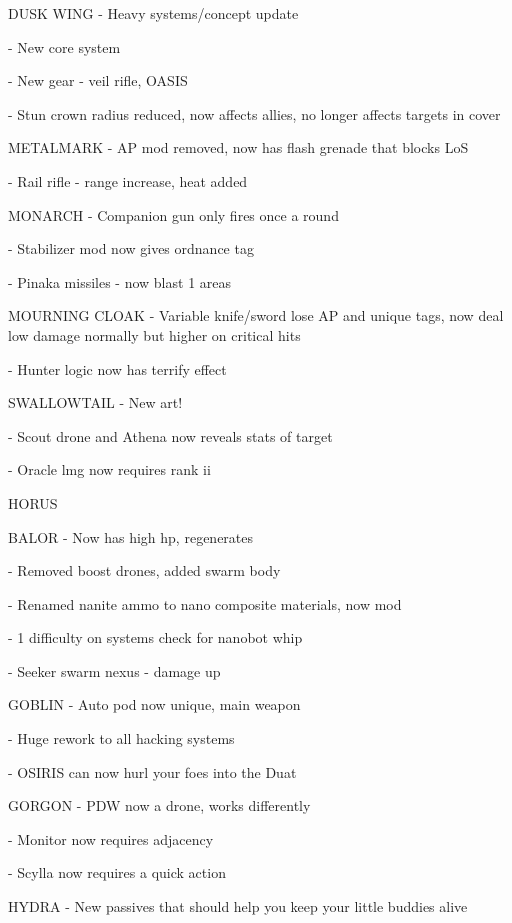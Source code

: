 DUSK WING
    -    Heavy systems/concept update


    -    New core system

    -    New gear - veil rifle, OASIS


    -    Stun crown radius reduced, now affects allies, no longer affects targets in cover

METALMARK
    -    AP mod removed, now has flash grenade that blocks LoS


    -    Rail rifle - range increase, heat added

MONARCH
    -    Companion gun only fires once a round


    -    Stabilizer mod now gives ordnance tag

    -    Pinaka missiles - now blast 1 areas


MOURNING CLOAK
    -    Variable knife/sword lose AP and unique tags, now deal low damage normally but higher on critical
         hits

    -    Hunter logic now has terrify effect


SWALLOWTAIL
    -    New art!

    -    Scout drone and Athena now reveals stats of target


    -    Oracle lmg now requires rank ii


                                                      HORUS

BALOR
    -    Now has high hp, regenerates


    -    Removed boost drones, added swarm body

    -    Renamed nanite ammo to nano composite materials, now mod

    -    1 difficulty on systems check for nanobot whip


    -    Seeker swarm nexus - damage up


GOBLIN
    -    Auto pod now unique, main weapon


    -    Huge rework to all hacking systems

    -    OSIRIS can now hurl your foes into the Duat


GORGON
    -    PDW now a drone, works differently

    -    Monitor now requires adjacency


    -    Scylla now requires a quick action

HYDRA
    -    New passives that should help you keep your little buddies alive





